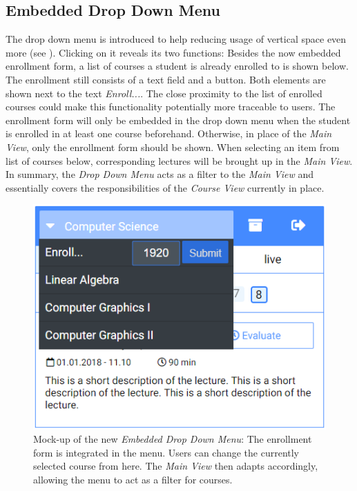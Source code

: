 \subsection{Embedded Drop Down Menu}
\label{section:con:proposals:dropdown}
The drop down menu is introduced to help reducing usage of vertical space even more (see ). Clicking on it reveals its two functions: Besides the now embedded enrollment form, a list of courses a student is already enrolled to is shown below. The enrollment still consists of a text field and a button. Both elements are shown next to the text \emph{Enroll...}. The close proximity to the list of enrolled courses could make this functionality potentially more traceable to users. The enrollment form will only be embedded in the drop down menu when the student is enrolled in at least one course beforehand. Otherwise, in place of the \emph{Main View}, only the enrollment form should be shown.
When selecting an item from list of courses below, corresponding lectures will be brought up in the \emph{Main View}.
In summary, the \emph{Drop Down Menu} acts as a filter to the \emph{Main View} and essentially covers the responsibilities of the \emph{Course View} currently in place.

\begin{figure}[ht]
	\begin{minipage}[t]{\textwidth}
		\centering
		\includegraphics[width=.7\textwidth]{mockups/embedded_drop_down.png}
		\captionsetup{width=.8\linewidth}
		\caption{Mock-up of the new \emph{Embedded Drop Down Menu}:
			The enrollment form is integrated in the menu. Users can change the currently selected course from here. The \emph{Main View} then adapts accordingly, allowing the menu to act as a filter for courses.
		}
		\label{figure:embeddeddropdown}
	\end{minipage}
\end{figure}

